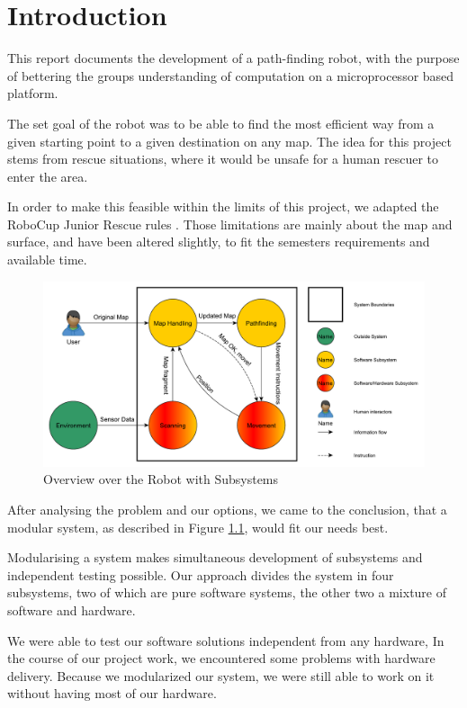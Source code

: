 \chapter{Introduction}\label{ch:introduction}
This report documents the development of a path-finding robot,
with the purpose of bettering the groups understanding of computation on a microprocessor based platform.

The set goal of the robot was to be able to find the most efficient way
from a given starting point to a given destination on any map.
The idea for this project stems from rescue situations,
where it would be unsafe for a human rescuer to enter the area.

In order to make this feasible within the limits of this project,
we adapted the RoboCup Junior Rescue rules \cite{Robocup}.
Those limitations are mainly about the map and surface,
and have been altered slightly,
to fit the semesters requirements and available time.

\begin{figure}[!ht]
	\centering
	\includegraphics[width=\textwidth]{figures/intro/systemview}
	\caption{Overview over the Robot with Subsystems}
	\label{fig:system} 
\end{figure}
After analysing the problem and our options,
we came to the conclusion,
that a modular system,
as described in Figure \ref{fig:system},
would fit our needs best.

Modularising a system makes simultaneous development of subsystems
and independent testing possible.
Our approach divides the system in four subsystems,
two of which are pure software systems,
the other two a mixture of software and hardware.

We were able to test our software solutions independent from any hardware,
In the course of our project work,
we encountered some problems with hardware delivery.
Because we modularized our system,
we were still able to work on it without having most of our hardware.

